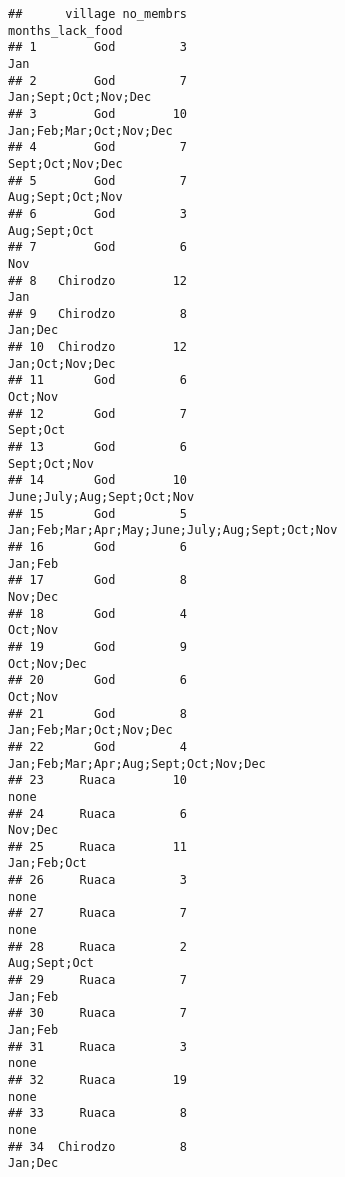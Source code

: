\documentclass[
]{article}
\begin{document}
\begin{verbatim}
##      village no_membrs                               months_lack_food
## 1        God         3                                            Jan
## 2        God         7                           Jan;Sept;Oct;Nov;Dec
## 3        God        10                        Jan;Feb;Mar;Oct;Nov;Dec
## 4        God         7                               Sept;Oct;Nov;Dec
## 5        God         7                               Aug;Sept;Oct;Nov
## 6        God         3                                   Aug;Sept;Oct
## 7        God         6                                            Nov
## 8   Chirodzo        12                                            Jan
## 9   Chirodzo         8                                        Jan;Dec
## 10  Chirodzo        12                                Jan;Oct;Nov;Dec
## 11       God         6                                        Oct;Nov
## 12       God         7                                       Sept;Oct
## 13       God         6                                   Sept;Oct;Nov
## 14       God        10                     June;July;Aug;Sept;Oct;Nov
## 15       God         5 Jan;Feb;Mar;Apr;May;June;July;Aug;Sept;Oct;Nov
## 16       God         6                                        Jan;Feb
## 17       God         8                                        Nov;Dec
## 18       God         4                                        Oct;Nov
## 19       God         9                                    Oct;Nov;Dec
## 20       God         6                                        Oct;Nov
## 21       God         8                        Jan;Feb;Mar;Oct;Nov;Dec
## 22       God         4           Jan;Feb;Mar;Apr;Aug;Sept;Oct;Nov;Dec
## 23     Ruaca        10                                           none
## 24     Ruaca         6                                        Nov;Dec
## 25     Ruaca        11                                    Jan;Feb;Oct
## 26     Ruaca         3                                           none
## 27     Ruaca         7                                           none
## 28     Ruaca         2                                   Aug;Sept;Oct
## 29     Ruaca         7                                        Jan;Feb
## 30     Ruaca         7                                        Jan;Feb
## 31     Ruaca         3                                           none
## 32     Ruaca        19                                           none
## 33     Ruaca         8                                           none
## 34  Chirodzo         8                                        Jan;Dec

\end{verbatim}
\end{document}

